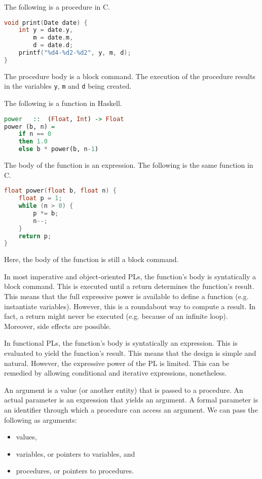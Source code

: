 \documentclass[a4paper, openany]{memoir}
\begin{document}
The following is a procedure in C.
\begin{lstlisting}[language=C]
void print(Date date) {
    int y = date.y,
        m = date.m,
        d = date.d;
    printf("%d4-%d2-%d2", y, m, d);
}
\end{lstlisting}
The procedure body is a block command. The execution of the procedure results in the variables \texttt{y}, \texttt{m} and \texttt{d} being created.

The following is a function in Haskell.
\begin{lstlisting}[language=Haskell]
power   ::  (Float, Int) -> Float
power (b, n) =
    if n == 0
    then 1.0
    else b * power(b, n-1)
\end{lstlisting}
The body of the function is an expression. The following is the same function in C.
\begin{lstlisting}[language=C]
float power(float b, float n) {
    float p = 1;
    while (n > 0) {
        p *= b;
        n--;
    }
    return p;
}
\end{lstlisting}
Here, the body of the function is still a block command.

In most imperative and object-oriented PLs, the function's body is syntatically a block command. This is executed until a return determines the function's result. This means that the full expressive power is available to define a function (e.g. instantiate variables). However, this is a roundabout way to compute a result. In fact, a return might never be executed (e.g. because of an infinite loop). Moreover, side effects are possible.

In functional PLs, the function's body is syntatically an expression. This is evaluated to yield the function's result. This means that the design is simple and natural. However, the expressive power of the PL is limited. This can be remedied by allowing conditional and iterative expressions, nonetheless.

An argument is a value (or another entity) that is passed to a procedure. An actual parameter is an expression that yields an argument. A formal parameter is an identifier through which a procedure can access an argument. We can pass the following as arguments:
\begin{itemize}
    \item values,
    \item variables, or pointers to variables, and
    \item procedures, or pointers to procedures.
\end{itemize}
\end{document}
